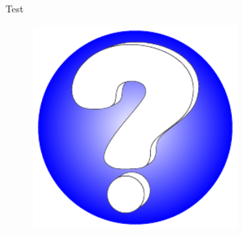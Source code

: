 \documentclass{beamer}
\begin{document}
\begin{frame}{Test}
  \begin{figure}
    \includegraphics[width=0.7\textwidth, keepaspectratio]{figs/vprasaj.pdf}
  \end{figure}
\end{frame}
\end{document}
